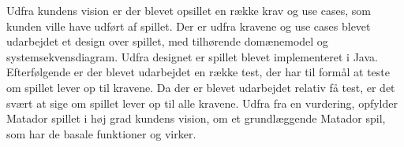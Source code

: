 Udfra kundens vision er der blevet opsillet en række krav og use cases, som kunden ville have udført af spillet. Der er udfra kravene og use cases blevet udarbejdet et design over spillet, med tilhørende domænemodel og systemsekvensdiagram. Udfra designet er spillet blevet implementeret i Java. Efterfølgende er der blevet udarbejdet en række test, der har til formål at teste om spillet lever op til kravene. Da der er blevet udarbejdet relativ få test, er det svært at sige om spillet lever op til alle kravene. Udfra fra en vurdering, opfylder Matador spillet  i høj grad kundens vision, om et grundlæggende Matador spil, som har de basale funktioner og virker.


